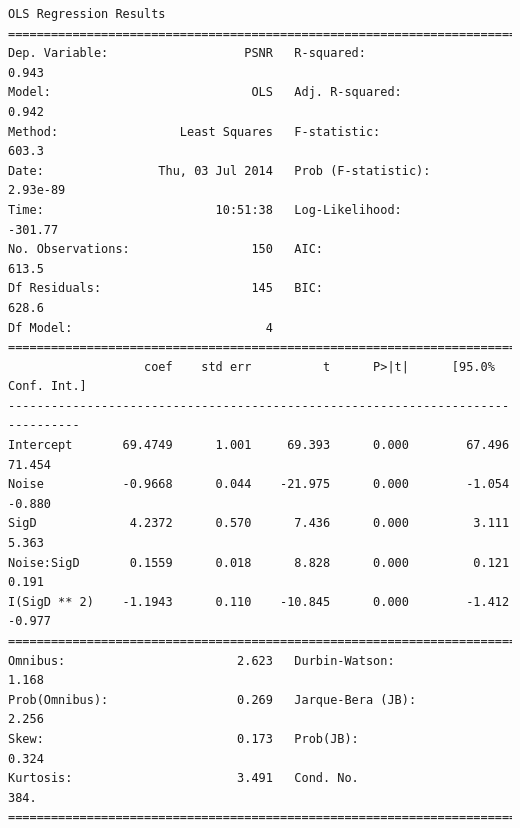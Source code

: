 \documentclass[11pt]{article}
\theoremstyle{definition}
\begin{document}
{\begin{lstlisting}[caption = Time Series 2 - Gaussian Filter OLS Model, label = {gaussianfilterseries2}]
                            OLS Regression Results                            
==============================================================================
Dep. Variable:                   PSNR   R-squared:                       0.943
Model:                            OLS   Adj. R-squared:                  0.942
Method:                 Least Squares   F-statistic:                     603.3
Date:                Thu, 03 Jul 2014   Prob (F-statistic):           2.93e-89
Time:                        10:51:38   Log-Likelihood:                -301.77
No. Observations:                 150   AIC:                             613.5
Df Residuals:                     145   BIC:                             628.6
Df Model:                           4                                         
================================================================================
                   coef    std err          t      P>|t|      [95.0% Conf. Int.]
--------------------------------------------------------------------------------
Intercept       69.4749      1.001     69.393      0.000        67.496    71.454
Noise           -0.9668      0.044    -21.975      0.000        -1.054    -0.880
SigD             4.2372      0.570      7.436      0.000         3.111     5.363
Noise:SigD       0.1559      0.018      8.828      0.000         0.121     0.191
I(SigD ** 2)    -1.1943      0.110    -10.845      0.000        -1.412    -0.977
==============================================================================
Omnibus:                        2.623   Durbin-Watson:                   1.168
Prob(Omnibus):                  0.269   Jarque-Bera (JB):                2.256
Skew:                           0.173   Prob(JB):                        0.324
Kurtosis:                       3.491   Cond. No.                         384.
==============================================================================
\end{lstlisting}

}
\end{document}
